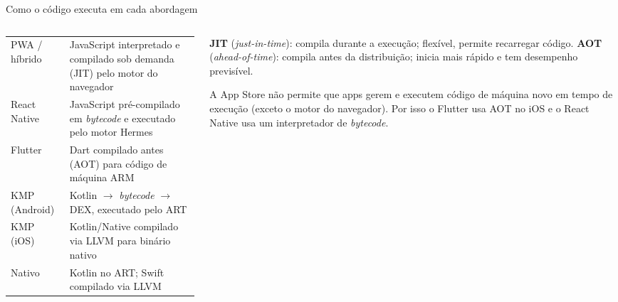 \begin{frame}{Como o código executa em cada abordagem}
  \begin{columns}[T]
    \begin{column}{0.52\textwidth}
      \scriptsize
      \begin{tabularx}{\linewidth}{@{}l L@{}}
        \toprule
         &  \\
        \midrule
        PWA / híbrido & JavaScript interpretado e compilado sob demanda (JIT) pelo motor do navegador \\
        React Native & JavaScript pré-compilado em \emph{bytecode} e executado pelo motor Hermes \\
        Flutter & Dart compilado antes (AOT) para código de máquina ARM \\
        KMP (Android) & Kotlin $\rightarrow$ \emph{bytecode} $\rightarrow$ DEX, executado pelo ART \\
        KMP (iOS) & Kotlin/Native compilado via LLVM para binário nativo \\
        Nativo & Kotlin no ART; Swift compilado via LLVM \\
        \bottomrule
      \end{tabularx}
    \end{column}
    \begin{column}{0.46\textwidth}
      \begin{definicao}
        \textbf{JIT} (\emph{just-in-time}): compila durante a execução; flexível, permite recarregar código.
        \textbf{AOT} (\emph{ahead-of-time}): compila antes da distribuição; inicia mais rápido e tem desempenho previsível.
      \end{definicao}
      \begin{pordentro}
        A App Store não permite que apps gerem e executem código de máquina novo em tempo de execução (exceto o motor do navegador). Por isso o Flutter usa AOT no iOS e o React Native usa um interpretador de \emph{bytecode}.
      \end{pordentro}
    \end{column}
  \end{columns}
\end{frame}

